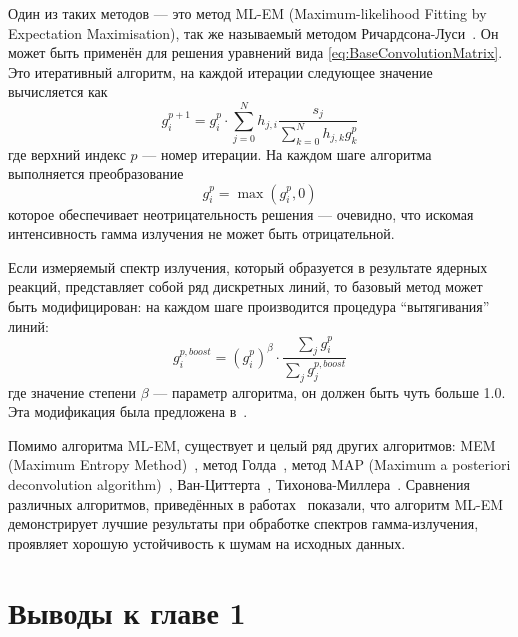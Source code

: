 Один из таких методов --- это метод ML-EM (Maximum-likelihood Fitting by Expectation Maximisation), так же называемый методом Ричардсона-Луси~\cite{Vardi1985,Richardson1972,Lucy1974}. Он может быть применён для решения уравнений вида \ref{eq:BaseConvolutionMatrix}.~\cite{Khilkevitch2013,Shevelev2013,Meng2000,Morhac2011} Это итеративный алгоритм, на каждой итерации следующее значение вычисляется как
\begin{equation}
  \label{eq:MlemBase}
  g_i^{p+1} = g_i^p \cdot \sum \limits_{j = 0 }^{N} h_{j,i} \frac{ s_j }{ \sum \limits_{k=0}^{N} h_{j,k} g_k^p }
\end{equation}
где верхний индекс $p$ --- номер итерации. На каждом шаге алгоритма выполняется преобразование 
\begin{equation*}
  g_i^p = \max \left( g_i^p, 0 \right)
\end{equation*}
которое обеспечивает неотрицательность решения --- очевидно, что искомая интенсивность гамма излучения не может быть отрицательной.

Если измеряемый спектр излучения, который образуется в результате ядерных реакций, представляет собой ряд дискретных линий, то базовый метод может быть модифицирован: на каждом шаге производится процедура ``вытягивания'' линий:
\begin{equation}
  \label{eq:BoostMlemDisturb}
  g^{p, boost}_i = \left( g^p_i \right)^{\beta} \cdot \frac{ \sum_j g^p_i }{ \sum_j g^{p, boost}_j }
\end{equation}
где значение степени $\beta$ --- параметр алгоритма, он должен быть чуть больше 1.0. Эта модификация была предложена в~\cite{Morhac2011}.

Помимо алгоритма ML-EM, существует и целый ряд других алгоритмов: MEM (Maximum Entropy Method)~\cite{Jaynes1988,Meng2000}, метод Голда~\cite{Gold1964}, метод MAP (Maximum a posteriori deconvolution algorithm)~\cite{Hunt1994}, Ван-Циттерта~\cite{VanCittert1931}, Тихонова-Миллера~\cite{Tikhonov1963}. Сравнения различных алгоритмов, приведённых в работах~\cite{Meng2000,Morhac2011,Panontin2021,Lanteri1999,Jeffrey1986,Bouchet1995} показали, что алгоритм ML-EM демонстрирует лучшие результаты при обработке спектров гамма-излучения, проявляет хорошую устойчивость к шумам на исходных данных.


\FloatBarrier
\section{Выводы к главе 1}

